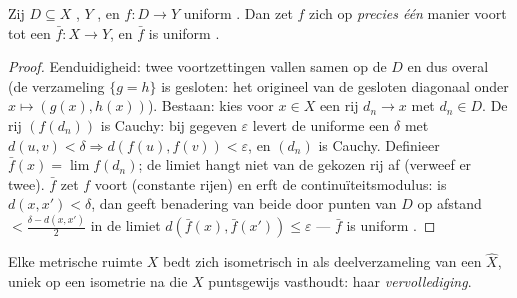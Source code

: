 \begin{theorem}
\label{thm:b3:complete:extension}
Zij $D \subseteq X$ , $Y$ , en $f \colon D \to Y$
uniform . Dan zet $f$ zich op \emph{precies één} manier
voort tot een  $\bar f \colon X \to Y$, en $\bar f$ is
uniform .
\end{theorem}

\begin{proof}
Eenduidigheid: twee  voortzettingen vallen samen op de
 $D$ en dus overal (de verzameling $\{g = h\}$ is gesloten:
het origineel van de gesloten diagonaal onder $x\mapsto(g(x),
h(x))$). Bestaan: kies voor $x \in X$ een rij $d_n \to x$ met $d_n
\in D$. De rij $(f(d_n))$ is Cauchy: bij gegeven $\varepsilon$
levert de uniforme  een $\delta$ met $d(u,v) < \delta
\Rightarrow d(f(u), f(v)) < \varepsilon$, en $(d_n)$ is Cauchy.
Definieer $\bar f(x) = \lim f(d_n)$; de limiet hangt niet van de
gekozen rij af (verweef er twee). $\bar f$ zet $f$ voort
(constante rijen) en erft de continuïteitsmodulus: is $d(x, x') <
\delta$, dan geeft benadering van beide door punten van $D$ op
afstand $< \frac{\delta - d(x,x')}2$ in de limiet $d(\bar f(x),
\bar f(x')) \leq \varepsilon$ --- $\bar f$ is uniform .
\end{proof}

\begin{theorem}[Vervollediging]\label{thm:b3:complete:completion}
Elke metrische ruimte $X$ bedt zich isometrisch in als 
deelverzameling van een  $\hat X$, uniek
op een isometrie na die $X$ puntsgewijs vasthoudt: haar
\emph{vervollediging}.
\end{theorem}

